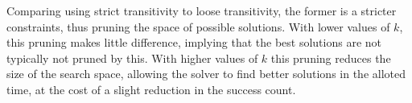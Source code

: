 Comparing using strict transitivity to loose transitivity, the former is a stricter constraints, thus pruning the space of possible solutions. With lower values of $k$, this pruning makes little difference, implying that the best solutions are not typically not pruned by this. With higher values of $k$ this pruning reduces the size of the search space, allowing the solver to find better solutions in the alloted time, at the cost of a slight reduction in the success count. 



